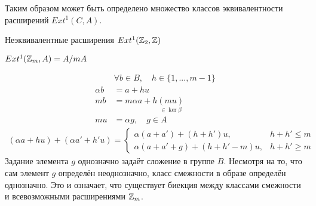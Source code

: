 \documentclass[../hw_main.tex]{subfiles}
\begin{document}
Таким образом может быть определено множество классов эквивалентности расширений $Ext^1(C, A)$.
\begin{to_ex}
Неэквивалентные расширения $Ext^1(\mathbb{Z}_2, \mathbb{Z})$
\bee
{}
\eee
\end{to_ex}
\begin{to_ex}
$Ext^1(\mathbb{Z}_m, A) = A /mA$
\bee
{}
\eee

\begin{align*}
    &\forall b \in B,\quad h \in \{1, ..., m-1\} \\
    \alpha b &= a + h u \\
    mb &= m\alpha a + h\underset{\in\ker \beta }{(mu)}\\
    mu &= \alpha g, \quad g \in A
\end{align*}
\begin{align*}
    (\alpha a + h u )+(\alpha a' + h'u) = \begin{cases}\alpha(a + a') + (h + h')u, & h + h' \le m \\ \alpha(a+a'+g) + (h + h' - m)u, & h+h' \geq m \end{cases}
\end{align*}
Задание элемента $g$ однозначно задаёт сложение в группе $B$. Несмотря на то, что сам элемент $g$ определён неоднозначно, класс смежности в образе определён однозначно. Это и означает, что существует биекция между классами смежности и всевозможными расширениями $\mathbb{Z}_m
$. 
\end{to_ex} 
\end{document}
